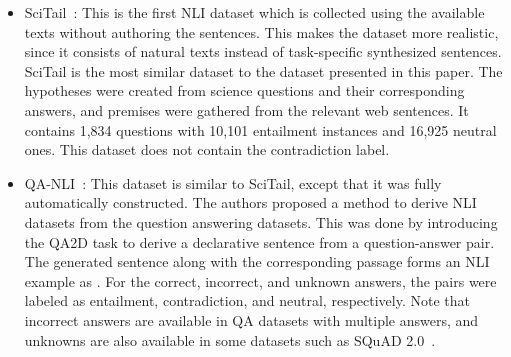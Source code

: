 \documentclass[preprint,12pt]{elsarticle}
\begin{document}
\begin{itemize}
    \item SciTail~\citep{khot2018scitail}: This is the first NLI dataset which is collected using the available texts without authoring the sentences. This makes the dataset more realistic, since it consists of natural texts instead of task-specific synthesized sentences. SciTail is the most similar dataset to the dataset presented in this paper. The hypotheses were created from science questions and their corresponding answers, and premises were gathered from the relevant web sentences. It contains 1,834 questions with 10,101 entailment instances and 16,925 neutral ones. This dataset does not contain the contradiction label. 
    \item QA-NLI~\citep{demszky2018transforming}: This dataset is similar to SciTail, except that it was fully automatically constructed. The authors proposed a method to derive NLI datasets from the question answering datasets. This was done by introducing the QA2D task to derive a declarative sentence from a question-answer pair. The generated sentence  along with the corresponding passage  forms an NLI example as . For the correct, incorrect, and unknown answers, the pairs were labeled as entailment, contradiction, and neutral, respectively. Note that incorrect answers are available in QA datasets with multiple answers, and unknowns are also available in some datasets such as SQuAD 2.0~\citep{rajpurkar2018know}. 
\end{itemize}
\end{document}

